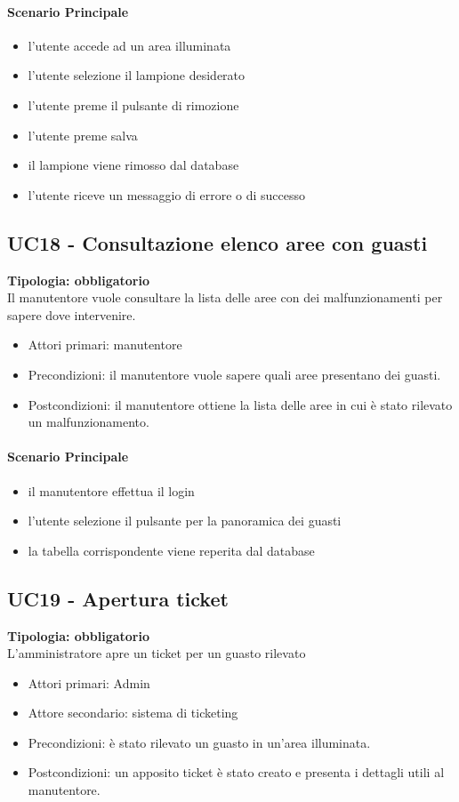 \documentclass[12pt]{article}
\begin{document}
\paragraph{Scenario Principale}
\begin{itemize}
	\item l'utente accede ad un area illuminata
	\item l'utente selezione il lampione desiderato
	\item l'utente preme il pulsante di rimozione
	\item l'utente preme salva
	\item il lampione viene rimosso dal database
	\item l'utente riceve un messaggio di errore o di successo
\end{itemize}


\subsection{UC18 - Consultazione elenco aree con guasti}
\textbf{Tipologia: obbligatorio}\\
Il manutentore vuole consultare la lista delle aree con dei malfunzionamenti per sapere dove intervenire.
\begin{itemize}
	\item Attori primari: manutentore
	\item Precondizioni: il manutentore vuole sapere quali aree presentano dei guasti.\\
	\item Postcondizioni: il manutentore ottiene la lista delle aree in cui è stato rilevato un malfunzionamento.
\end{itemize}
\paragraph{Scenario Principale}
\begin{itemize}
	\item il manutentore effettua il login
	\item l'utente selezione il pulsante per la panoramica dei guasti
	\item la tabella corrispondente viene reperita dal database
\end{itemize}


\subsection{UC19 - Apertura ticket}
\textbf{Tipologia: obbligatorio}\\
L'amministratore apre un ticket per un guasto rilevato
\begin{itemize}
	\item Attori primari: Admin
	\item Attore secondario: sistema di ticketing
	\item Precondizioni: è stato rilevato un guasto in un'area illuminata.
	\item Postcondizioni: un apposito ticket è stato creato e presenta i dettagli utili al manutentore.
\end{itemize}
\end{document}
